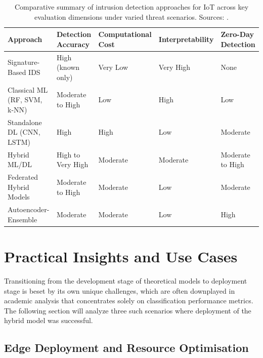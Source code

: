 \documentclass[12pt]{article}
\begin{document}
\begin{table}[H]
    \centering
    \caption{Comparative summary of intrusion detection approaches for IoT across key evaluation dimensions under varied threat scenarios. Sources: \cite{ferrag2020deep,zhang2019hybrid,mirsky2018kitsune,vinayakumar2019deep}.}
    \label{tab:comparison}
    \begin{tabular}{|p{3.0cm}|p{2.2cm}|p{2.4cm}|p{2.3cm}|p{2.6cm}|}
        \hline
        \textbf{Approach} & \textbf{Detection Accuracy} & \textbf{Computational Cost} & \textbf{Interpretability} & \textbf{Zero-Day Detection} \\
        \hline
        Signature-Based IDS & High (known only) & Very Low & Very High & None \\
        \hline
        Classical ML (RF, SVM, k-NN) & Moderate to High & Low & High & Low \\
        \hline
        Standalone DL (CNN, LSTM) & High & High & Low & Moderate \\
        \hline
        Hybrid ML/DL & High to Very High & Moderate & Moderate & Moderate to High \\
        \hline
        Federated Hybrid Models & Moderate to High & Moderate & Low & Moderate \\
        \hline
        Autoencoder-Ensemble & Moderate & Moderate & Low & High \\
        \hline
    \end{tabular}
\end{table}


\section{Practical Insights and Use Cases}

Transitioning from the development stage of theoretical models to deployment stage is beset by its own unique challenges, which are often downplayed in academic analysis that concentrates solely on classification performance metrics. The following section will analyze three such scenarios where deployment of the hybrid model was successful.

\subsection{Edge Deployment and Resource Optimisation}
\end{document}
